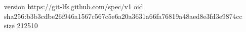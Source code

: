 version https://git-lfs.github.com/spec/v1
oid sha256:b3b3cdbe26f946a1567c567c5e6a20a3631a66fa76819a48aed8e3fd3e9874cc
size 212510
